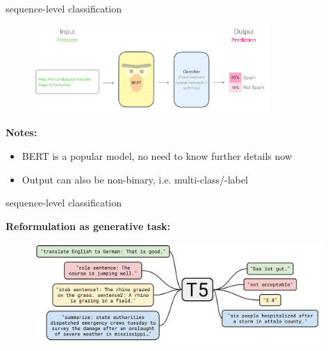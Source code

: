 \begin{vbframe}{sequence-level classification}

\vfill

	\begin{figure}
		\centering
		\includegraphics[width = 9cm]{figure/seqlevel.png}\\ 
	\end{figure}
	
\textbf{Notes:}

\begin{itemize}
	\item BERT is a popular model, no need to know further details now 
	\item Output can also be non-binary, i.e. multi-class/-label 
\end{itemize}

\vfill

\end{vbframe}


\begin{vbframe}{sequence-level classification}

\vfill

\textbf{Reformulation as generative task:}

	\begin{figure}
		\centering
		\includegraphics[width = 11cm]{../chapter06-t5/figure/t5.png}\\ 
	\end{figure}

\vfill

\end{vbframe}

